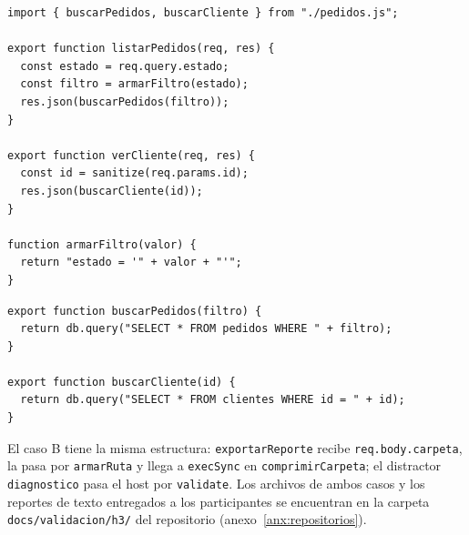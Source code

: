 \begin{lstlisting}[caption={Caso A, archivo \texttt{rutas.js}}, label={lst:caso-a-rutas}]
import { buscarPedidos, buscarCliente } from "./pedidos.js";

export function listarPedidos(req, res) {
  const estado = req.query.estado;
  const filtro = armarFiltro(estado);
  res.json(buscarPedidos(filtro));
}

export function verCliente(req, res) {
  const id = sanitize(req.params.id);
  res.json(buscarCliente(id));
}

function armarFiltro(valor) {
  return "estado = '" + valor + "'";
}
\end{lstlisting}

\begin{lstlisting}[caption={Caso A, archivo \texttt{pedidos.js}}, label={lst:caso-a-pedidos}]
export function buscarPedidos(filtro) {
  return db.query("SELECT * FROM pedidos WHERE " + filtro);
}

export function buscarCliente(id) {
  return db.query("SELECT * FROM clientes WHERE id = " + id);
}
\end{lstlisting}

El caso B tiene la misma estructura: \texttt{exportarReporte} recibe
\texttt{req.body.carpeta}, la pasa por \texttt{armarRuta} y llega a
\texttt{execSync} en \texttt{comprimirCarpeta}; el distractor
\texttt{diagnostico} pasa el host por \texttt{validate}. Los archivos de
ambos casos y los reportes de texto entregados a los participantes se
encuentran en la carpeta \texttt{docs/validacion/h3/} del repositorio
(anexo~\ref{anx:repositorios}).
